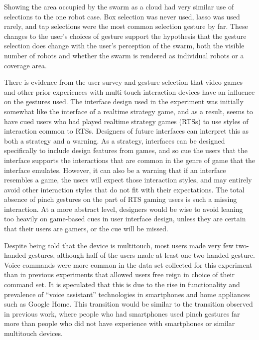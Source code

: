 Showing the area occupied by the swarm as a cloud had very similar use of selections to the one robot case. 
Box selection was never used, lasso was used rarely, and tap selections were the most common selection gesture by far. 
These changes to the user's choices of gesture support the hypothesis that the gesture selection does change with the user's perception of the swarm, both the visible number of robots and whether the swarm is rendered as individual robots or a coverage area. 

There is evidence from the user survey and gesture selection that video games and other prior experiences with multi-touch interaction devices have an influence on the gestures used. 
The interface design used in the experiment was initially somewhat like the interface of a realtime strategy game, and as a result, seems to have cued users who had played realtime strategy games (RTSs) to use styles of interaction common to RTSs.
Designers of future interfaces can interpret this as both a strategy and a warning. 
As a strategy, interfaces can be designed specifically to include design features from games, and so cue the users that the interface supports the interactions that are common in the genre of game that the interface emulates. 
However, it can also be a warning that if an interface resembles a game, the users will expect those interaction styles, and may entirely avoid other interaction styles that do not fit with their expectations. 
The total absence of pinch gestures on the part of RTS gaming users is such a missing interaction. 
At a more abstract level, designers would be wise to avoid leaning too heavily on game-based cues in user interface design, unless they are certain that their users are gamers, or the cue will be missed. 

Despite being told that the device is multitouch, most users made very few two-handed gestures, although half of the users made at least one two-handed gesture.  
Voice commands were more common in the data set collected for this experiment than in previous experiments that allowed users free reign in choice of their command set. 
It is speculated that this is due to the rise in functionality and prevalence of ``voice assistant'' technologies in smartphones and home appliances such as Google Home. 
This transition would be similar to the transition observed in previous work, where people who had smartphones used pinch gestures far more than people who did not have experience with smartphones or similar multitouch devices. 

